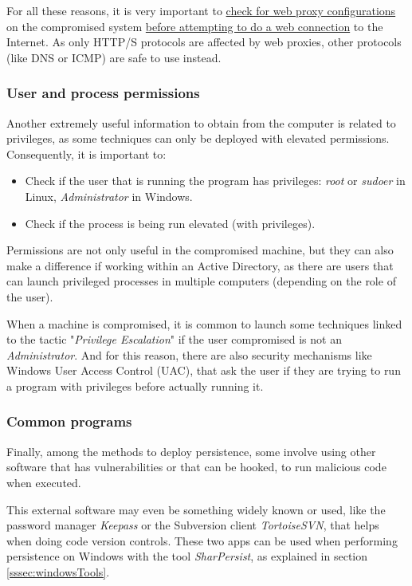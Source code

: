 For all these reasons, it is very important to \underline{check for web proxy configurations} on the compromised system \underline{before attempting to do a web connection} to the Internet. As only HTTP/S protocols are affected by web proxies, other protocols (like DNS or ICMP) are safe to use instead.

\subsubsection{User and process permissions}
Another extremely useful information to obtain from the computer is related to privileges, as some techniques can only be deployed with elevated permissions. Consequently, it is important to: 
\begin{itemize}
\item Check if the user that is running the program has privileges: \textit{root} or \textit{sudoer} in Linux, \textit{Administrator} in Windows.
\item Check if the process is being run elevated (with privileges).
\end{itemize}

Permissions are not only useful in the compromised machine, but they can also make a difference if working within an Active Directory, as there are users that can launch privileged processes in multiple computers (depending on the role of the user).

When a machine is compromised, it is common to launch some techniques linked to the tactic "\textit{Privilege Escalation}" if the user compromised is not an \textit{Administrator}. And for this reason, there are also security mechanisms like Windows User Access Control (UAC), that ask the user if they are trying to run a program with privileges before actually running it.

\subsubsection{Common programs}
Finally, among the methods to deploy persistence, some involve using other software that has vulnerabilities or that can be hooked\footnotemark, to run malicious code when executed.

This external software may even be something widely known or used, like the password manager \textit{Keepass}\cite{KeePassWeb} or the Subversion client \textit{TortoiseSVN}\cite{TortoiseSVNWeb}, that helps when doing code version controls. These two apps can be used when performing persistence on Windows with the tool \textit{SharPersist}\cite{SharPersist}, as explained in section \ref{sssec:windowsTools}.

